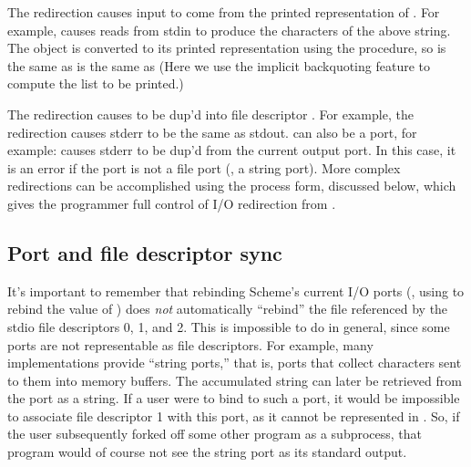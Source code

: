 The redirection  causes input to come from the 
printed representation of . 
For example,
causes reads from stdin to produce the characters of the above string.
The object is converted to its printed representation using the 
procedure, so
is the same as
is the same as
(Here we use the implicit backquoting feature to compute the list to 
be printed.)

The redirection  causes  
to be dup'd into file descriptor .
For example, the redirection
causes stderr to be the same as stdout. 
 can also be a port, for example:
causes stderr to be dup'd from the current output port. 
In this case,  it is an error if the port is not a file port
(\eg, a string port).
More complex redirections can be accomplished using the 
process form, discussed below, which gives the programmer full control
of I/O redirection from {\Scheme}.

\subsection{Port and file descriptor sync}
\begin{sloppypar}
It's important to remember that rebinding Scheme's current I/O ports
(\eg, using  to rebind the value of 
)
does \emph{not} automatically ``rebind'' the file referenced by the
{\Unix} stdio file descriptors 0, 1, and 2.
This is impossible to do in general, since some {\Scheme} ports are 
not representable as {\Unix} file descriptors.
For example, many {\Scheme} implementations provide ``string ports,'' 
that is, ports that collect characters sent to them into memory buffers.
The accumulated string can later be retrieved from the port as a string.
If a user were to bind  to such a port, it would
be impossible to associate file descriptor 1 with this port, as it
cannot be represented in {\Unix}.
So, if the user subsequently forked off some other program as a subprocess,
that program would of course not see the {\Scheme} string port as its standard
output.
\end{sloppypar}

